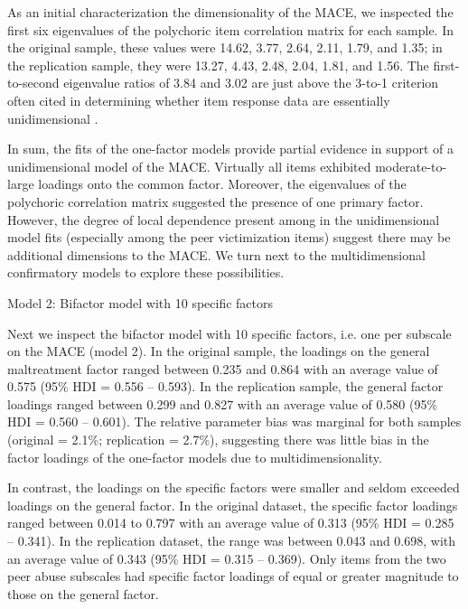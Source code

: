 \documentclass[letterpaper,man,natbib,noextraspace,floatsintext,longtable,12pt]{apa6}
\makeatletter
\renewcommand{\subsubsection}{\@startsection{subsubsection}{3}
  {\z@}%
  {\b@level@two@skip}{\e@level@two@skip}%
  {\normalfont\normalsize\bfseries}}
\makeatother
\begin{document}
As an initial characterization the dimensionality of the MACE, we inspected the first six eigenvalues of the polychoric item correlation matrix for each sample. In the original sample, these values were 14.62, 3.77, 2.64, 2.11, 1.79, and 1.35; in the replication sample, they were 13.27, 4.43, 2.48, 2.04, 1.81, and 1.56. The first-to-second eigenvalue ratios of 3.84 and 3.02 are just above the 3-to-1 criterion often cited in determining whether item response data are essentially unidimensional \citep{embretson2013item}. 

In sum, the fits of the one-factor models provide partial evidence in support of a unidimensional model of the MACE. Virtually all items exhibited moderate-to-large loadings onto the common factor. Moreover, the eigenvalues of the polychoric correlation matrix suggested the presence of one primary factor. However, the degree of local dependence present among in the unidimensional model fits (especially among the peer victimization items) suggest there may be additional dimensions to the MACE. We turn next to the multidimensional confirmatory models to explore these possibilities.

\subsubsection{Model 2: Bifactor model with 10 specific factors}

Next we inspect the bifactor model with 10 specific factors, i.e. one per subscale on the MACE (model 2). In the original sample, the loadings on the general maltreatment factor ranged between 0.235 and 0.864 with an average value of 0.575 (95\% HDI = 0.556 -- 0.593). In the replication sample, the general factor loadings ranged between 0.299 and 0.827 with an average value of 0.580 (95\% HDI = 0.560 -- 0.601). The relative parameter bias was marginal for both samples (original = 2.1\%; replication = 2.7\%), suggesting there was little bias in the factor loadings of the one-factor models due to multidimensionality.  

In contrast, the loadings on the specific factors were smaller and seldom exceeded loadings on the general factor. In the original dataset, the specific factor loadings ranged between 0.014 to 0.797 with an average value of 0.313 (95\% HDI = 0.285 -- 0.341). In the replication dataset, the range was between 0.043 and 0.698, with an average value of 0.343 (95\% HDI = 0.315 -- 0.369). Only items from the two peer abuse subscales had specific factor loadings of equal or greater magnitude to those on the general factor.
\end{document}
